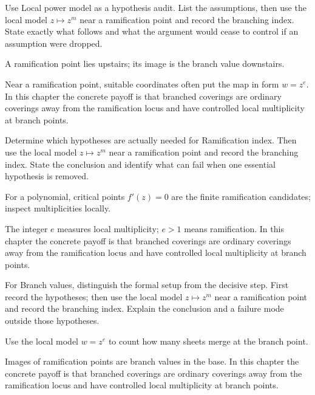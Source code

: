 \begin{exercise}\label{exr:iv24-02}
Use Local power model as a hypothesis audit. List the assumptions, then use the local model \(z\mapsto z^m\) near a ramification point and record the branching index. State exactly what follows and what the argument would cease to control if an assumption were dropped.
\end{exercise}
\begin{hint}
A ramification point lies upstairs; its image is the branch value downstairs.
\end{hint}
\begin{solution}
Near a ramification point, suitable coordinates often put the map in form $w=z^e$. In this chapter the concrete payoff is that branched coverings are ordinary coverings away from the ramification locus and have controlled local multiplicity at branch points.
\end{solution}

\begin{exercise}\label{exr:iv24-03}
Determine which hypotheses are actually needed for Ramification index. Then use the local model \(z\mapsto z^m\) near a ramification point and record the branching index. State the conclusion and identify what can fail when one essential hypothesis is removed.
\end{exercise}
\begin{hint}
For a polynomial, critical points \(f'(z)=0\) are the finite ramification candidates; inspect multiplicities locally.
\end{hint}
\begin{solution}
The integer $e$ measures local multiplicity; $e>1$ means ramification. In this chapter the concrete payoff is that branched coverings are ordinary coverings away from the ramification locus and have controlled local multiplicity at branch points.
\end{solution}

\begin{exercise}\label{exr:iv24-04}
For Branch values, distinguish the formal setup from the decisive step. First record the hypotheses; then use the local model \(z\mapsto z^m\) near a ramification point and record the branching index. Explain the conclusion and a failure mode outside those hypotheses.
\end{exercise}
\begin{hint}
Use the local model \(w=z^e\) to count how many sheets merge at the branch point.
\end{hint}
\begin{solution}
Images of ramification points are branch values in the base. In this chapter the concrete payoff is that branched coverings are ordinary coverings away from the ramification locus and have controlled local multiplicity at branch points.
\end{solution}

